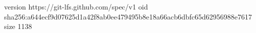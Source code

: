 version https://git-lfs.github.com/spec/v1
oid sha256:a644ecf9d07625d1a42f8ab0ee479495b8e18a66acb6dbfc65d62956988e7617
size 1138
